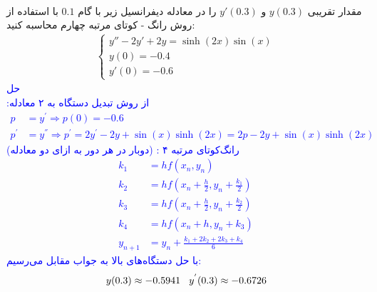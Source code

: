 \\
مقدار تقریبی
$y(0.3)$
و 
$y'(0.3)$ 
را در معادله دیفرانسیل زیر با گام 
$0.1$
با استفاده از روش رانگ - کوتای مرتبه چهارم محاسبه کنید:
\begin{align*}
\begin{cases}
y'' - 2y' + 2y = \sinh(2x) \sin(x) \\
y(0) = -0.4 \\
y'(0) = -0.6
\end{cases}
\end{align*}
\textcolor{blue}{حل
\\
از روش تبدیل دستگاه به ۲ معادله:
\begin{align*}
    p &= y^{'} \Rightarrow p(0) = -0.6 \\
    p^{'} &= y^{''} \Rightarrow p^{'} = 2y^{'} - 2y + \sin(x) \sinh(2x) = 2p - 2y + \sin(x) \sinh(2x)
\end{align*}
رانگ‌کوتای مرتبه ۴ : (دوبار در هر دور به ازای دو معادله)
\begin{align*}
    k_1 &= h f(x_n, y_n) \\
    k_2 &= hf(x_n + \frac{h}{2}, y_n + \frac{k_1}{2}) \\
    k_3 &= h f(x_n + \frac{h}{2}, y_n + \frac{k_2}{2}) \\
    k_4 &= hf(x_n + h, y_n + k_3) \\
    y_{n + 1} &= y_{n} + \frac{k_1 + 2k_2 + 2k_3 + k_4}{6}
\end{align*}
با حل دستگاه‌های بالا به جواب مقابل می‌رسیم:
\begin{align*}
    y(0.3) \approx -0.5941 \hspace{0.3 cm} y^{'}(0.3) \approx -0.6726
\end{align*}
}